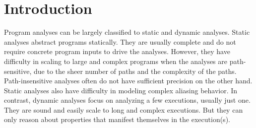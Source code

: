 




\section{Introduction}\label{Se:introduction}
Program analyses can be largely classified to static and dynamic analyses. Static analyses abstract programs statically.
They are usually complete and do not require concrete program inputs to drive the analyses. However, they have difficulty in
scaling to large and complex programs when the analyses are path-sensitive, due to the sheer number of paths and the 
complexity of the paths. Path-insensitive analyses often do not have sufficient precision on the other hand. 
Static analyses also have difficulty in modeling complex aliasing behavior. In contrast, dynamic analyses focus 
on analyzing a few executions, usually just one. They are sound and easily scale to long and complex executions. But they 
can only reason about properties that manifest themselves in the execution(s). 

